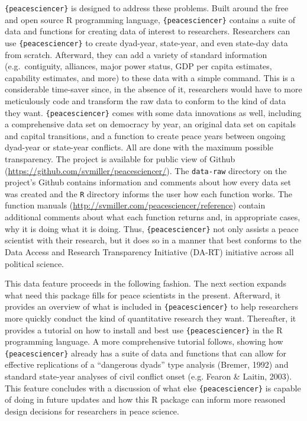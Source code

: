 \documentclass[
  11pt,
]{article}
\begin{document}
\texttt{\{peacesciencer\}} is designed to address these problems. Built around the free and open source R programming language, \texttt{\{peacesciencer\}} contains a suite of data and functions for creating data of interest to researchers. Researchers can use \texttt{\{peacesciencer\}} to create dyad-year, state-year, and even state-day data from scratch. Afterward, they can add a variety of standard information (e.g.~contiguity, alliances, major power status, GDP per capita estimates, capability estimates, and more) to these data with a simple command. This is a considerable time-saver since, in the absence of it, researchers would have to more meticulously code and transform the raw data to conform to the kind of data they want. \texttt{\{peacesciencer\}} comes with some data innovations as well, including a comprehensive data set on democracy by year, an original data set on capitals and capital transitions, and a function to create peace years between ongoing dyad-year or state-year conflicts. All are done with the maximum possible transparency. The project is available for public view of Github (\url{https://github.com/svmiller/peacesciencer/}). The \texttt{data-raw} directory on the project's Github contains information and comments about how every data set was created and the \texttt{R} directory informs the user how each function works. The function manuals (\url{http://svmiller.com/peacesciencer/reference}) contain additional comments about what each function returns and, in appropriate cases, why it is doing what it is doing. Thus, \texttt{\{peacesciencer\}} not only assists a peace scientist with their research, but it does so in a manner that best conforms to the Data Access and Research Transparency Initiative (DA-RT) initiative across all political science.

This data feature proceeds in the following fashion. The next section expands what need this package fills for peace scientists in the present. Afterward, it provides an overview of what is included in \texttt{\{peacesciencer\}} to help researchers more quickly conduct the kind of quantitative research they want. Thereafter, it provides a tutorial on how to install and best use \texttt{\{peacesciencer\}} in the R programming language. A more comprehensive tutorial follows, showing how \texttt{\{peacesciencer\}} already has a suite of data and functions that can allow for effective replications of a ``dangerous dyads'' type analysis (Bremer, 1992) and standard state-year analyses of civil conflict onset (e.g. Fearon \& Laitin, 2003). This feature concludes with a discussion of what else \texttt{\{peacesciencer\}} is capable of doing in future updates and how this R package can inform more reasoned design decisions for researchers in peace science.
\end{document}
